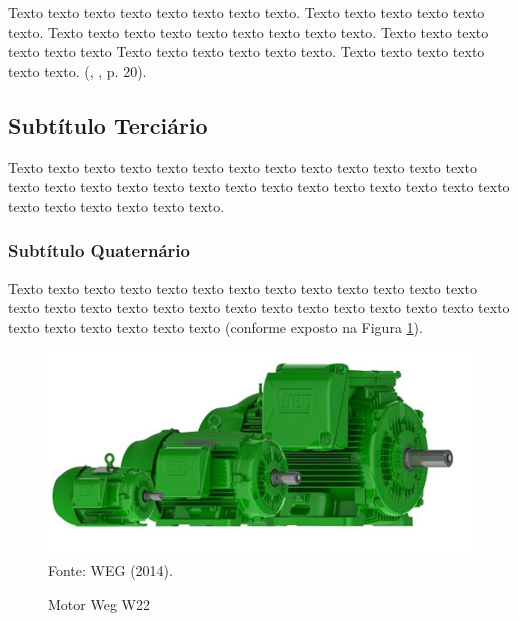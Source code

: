  \begin{citacao}
            \begin{alineas}[leftmargin=\leftskip+\labelwidth-\labelsep]
                Texto texto texto texto texto texto texto texto. Texto texto texto texto texto texto. Texto texto texto texto texto texto texto texto texto. Texto texto texto texto texto texto Texto texto texto texto texto texto. Texto texto texto texto texto texto. (\citeauthor{ref:ibmm}, \citeyear{ref:ibmm}, p. 20).
            \end{alineas}
\end{citacao}



\subsection{Subtítulo Terciário}

Texto texto texto texto texto texto texto texto texto texto texto texto texto texto texto texto texto texto texto texto texto texto texto texto texto texto texto texto texto texto texto texto texto.


\subsubsection{Subtítulo Quaternário}

Texto texto texto texto texto texto texto texto texto texto texto texto texto texto texto texto texto texto texto texto texto texto texto texto texto texto texto texto texto texto texto texto texto  (conforme exposto na Figura \ref{fig:motor}).



    \begin{figure}[H]
    	\centering
    	\caption{Motor Weg W22}
    	\includegraphics[scale=0.45]{figuras/motor.jpg}
    	\label{fig:motor}
    	\\
        \vspace{-0.8cm}\hspace{-7cm}\small{Fonte: WEG (2014).} 
    \end{figure}
    
